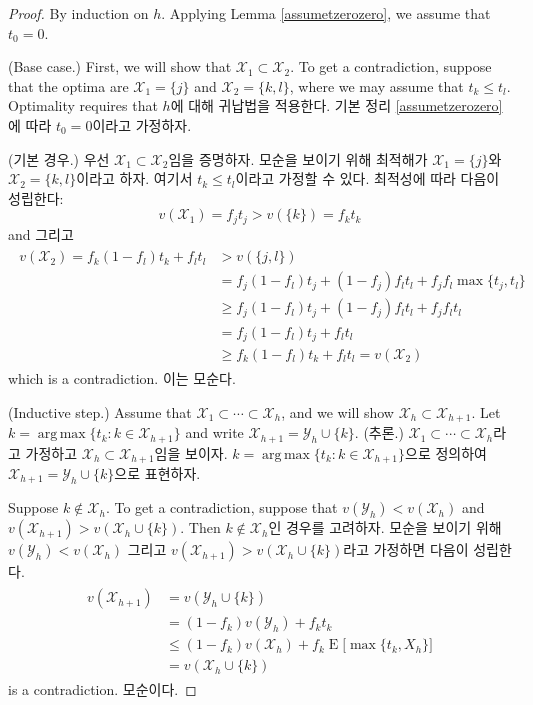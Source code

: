 \documentclass[11pt]{article} %
\DeclareMathOperator*{\argmax}{arg\,max}
\theoremstyle{definition}
\theoremstyle{definition}
\begin{document}
\begin{proof}\ifen
By induction on $h$. Applying Lemma \ref{assumetzerozero}, we assume that $t_0 = 0$. 

(Base case.) First, we will show that $\mathcal{X}_1 \subset \mathcal{X}_2$. To get a contradiction, suppose that the optima are $\mathcal{X}_1 = \{j\}$ and $\mathcal{X}_2 = \{k, l\}$, where we may assume that $t_k \leq t_l$. Optimality requires that
\else $h$에 대해 귀납법을 적용한다. 기본 정리 \ref{assumetzerozero}에 따라 $t_0 = 0$이라고 가정하자. 

(기본 경우.) 우선 $\mathcal{X}_1 \subset \mathcal{X}_2$임을 증명하자. 모순을 보이기 위해 최적해가 $\mathcal{X}_1 = \{j\}$와 $\mathcal{X}_2 = \{k, l\}$이라고 하자. 여기서 $t_k \leq t_l$이라고 가정할 수 있다. 최적성에 따라 다음이 성립한다:
\fi
\begin{equation}v(\mathcal{X}_1 )  = f_j t_j > v(\{k\}) = f_k t_k\end{equation}
\ifen and \else 그리고\fi
\begin{align}
\begin{split}
v(\mathcal{X}_2) =  f_k (1- f_l) t_k + f_l t_l &> v(\{j, l\}) \\
& = f_j (1- f_l) t_j + (1- f_j) f_l t_l + f_j f_l \max\{t_j, t_l\} \\
&\geq  f_j (1- f_l) t_j + (1- f_j) f_l t_l + f_j f_l  t_l \\
&= f_j (1- f_l) t_j + f_l t_l  \\
&\geq f_k (1- f_l) t_k + f_l t_l  = v(\mathcal{X}_2)
\end{split}
\end{align}
\ifen which is a contradiction. 
\else 이는 모순다.\fi

\ifen (Inductive step.) Assume that $\mathcal{X}_1 \subset \cdots \subset \mathcal{X}_h$, and we will show $\mathcal{X}_h \subset \mathcal{X}_{h+1}$. Let $k = \argmax\{ t_k: k \in \mathcal{X}_{h+1}\}$ and write $\mathcal{X}_{h+1} = \mathcal{Y}_{h} \cup \{k\}$.
\else (추론.) $\mathcal{X}_1 \subset \cdots \subset \mathcal{X}_h$라고 가정하고 $\mathcal{X}_h \subset \mathcal{X}_{h+1}$임을 보이자. $k = \argmax\{ t_k: k \in \mathcal{X}_{h+1}\}$으로 정의하여 $\mathcal{X}_{h+1} = \mathcal{Y}_{h} \cup \{k\}$으로 표현하자.\fi

\ifen Suppose $k \notin \mathcal{X}_h$. To get a contradiction, suppose that $v(\mathcal{Y}_h) < v(\mathcal{X}_h)$ and  $v(\mathcal{X}_{h+1}) > v(\mathcal{X}_h \cup \{k\})$. Then
\else $k \notin \mathcal{X}_h$인 경우를 고려하자. 모순을 보이기 위해 $v(\mathcal{Y}_h) < v(\mathcal{X}_h)$ 그리고 $v(\mathcal{X}_{h+1}) > v(\mathcal{X}_h \cup \{k\})$라고 가정하면 다음이 성립한다. \fi
\begin{align}
\begin{split}
v(\mathcal{X}_{h+1})&= v(\mathcal{Y}_{h} \cup \{k\}) \\
&= (1 - f_k) v(\mathcal{Y}_h) + f_k t_k \\
&\leq (1 - f_k) v(\mathcal{X}_h) + f_k \operatorname{E}\bigl[ \max\{t_k, X_h\}\bigr]\\
&=  v(\mathcal{X}_h\cup \{k\})
\end{split}
\end{align}
\ifen is a contradiction.
\else 모순이다.\fi


\end{proof}
\end{document}
